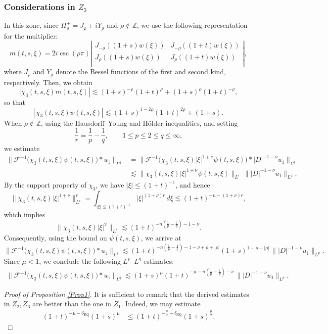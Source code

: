 \documentclass[10pt]{article}
\newcommand{\<}{\langle}
\renewcommand{\>}{\rangle}
\numberwithin{equation}{section}
\begin{document}
\subsubsection{Considerations in $Z_{3}$}
In this zone, since $H^{\pm}_{\rho}=J_{\rho} \pm i Y_{\rho}$ and $\rho\notin \mathbb{Z}$, we use the following representation for the multiplier:
\begin{equation*}\label{Bessel-BQ}
m(t, s, \xi)=2i\csc(\rho \pi)
\left| \begin{array}{cc}
J_{-\rho}\left( (1+s)w(\xi) \right) & J_{-\rho}\left( (1+t)w(\xi) \right) \\
J_{\rho}\left( (1+s)w(\xi) \right) &  J_{\rho}\left( (1+t)w(\xi) \right) \\
\end{array} \right|,
\end{equation*}
where $J_{\rho}$ and $Y_{\rho}$ denote the Bessel functions of the first and second kind, respectively. Then, we obtain
\[ |\chi_3(t, s,\xi) m(t, s, \xi)| \lesssim (1+s)^{-\rho}(1+t)^{\rho} + (1+s)^{\rho}(1+t)^{-\rho}, \]
so that
\[ |\chi_3(t, s,\xi) \psi(t,s,\xi)|\lesssim (1+s)^{1-2\rho}(1+t)^{2\rho} + (1+s). \]
When $\rho\not\in \mathbb{Z}$, using the Hausdorff--Young and Hölder inequalities, and setting
\[ \frac{1}{r}=\frac{1}{p}-\frac{1}{q}, \qquad 1\le p\le 2\le q\le\infty, \]
we estimate
\begin{align*}
\big\|\mathcal{F}^{-1}\big(\chi_3(t,s,\xi)\psi(t,s,\xi)\big)\ast u_1\big\|_{L^q}
&= \big\|\mathcal{F}^{-1}\big(\chi_3(t,s,\xi)|\xi|^{1+\nu}\psi(t,s,\xi)\big)\ast |D|^{-1-\nu}u_1\big\|_{L^q} \\
&\lesssim \|\chi_3(t,s,\xi)|\xi|^{1+\nu}\psi(t,s,\xi)\|_{L^r}\, \||D|^{-1-\nu}u_1\|_{L^p}.
\end{align*}
By the support property of $\chi_3$, we have $|\xi|\le (1+t)^{-1}$, and hence
\[ \|\chi_3(t,s,\xi)|\xi|^{1+\nu}\|_{L^r}^r = \int_{|\xi|\le (1+t)^{-1}}|\xi|^{(1+\nu)r}\,d\xi \lesssim (1+t)^{-n-(1+\nu)r}, \]
which implies
\[ \|\chi_3(t,s,\xi)|\xi|^{2}\|_{L^r} \lesssim (1+t)^{-n\left(\frac{1}{p}-\frac{1}{q}\right)-1-\nu}. \]
Consequently, using the bound on $\psi(t,s,\xi)$, we arrive at
\[ \big\|\mathcal{F}^{-1}\big(\chi_3(t,s,\xi)\psi(t,s,\xi)\big)\ast u_1\big\|_{L^q} \lesssim (1+t)^{-n\left(\frac{1}{p}-\frac{1}{q}\right)-1-\nu+\rho+|\rho|}(1+s)^{1-\rho-|\rho|} \,\||D|^{-1-\nu}u_1\|_{L^p}. \]
Since $\mu<1$, we conclude the following $L^p$--$L^q$ estimates:
\begin{align*}
\big\|\mathcal{F}^{-1}\big( \chi_3(t,s,\xi)\psi(t,s,\xi) \big)\ast u_1\big\|_{L^q}
\lesssim (1+s)^{\mu} (1+t)^{-\mu-n\left(\frac{1}{p}-\frac{1}{q}\right)-\nu} \,\||D|^{-1-\nu}u_1\|_{L^p}.
\end{align*}
\begin{proof}[Proof of Proposition \ref{Prop1}]
It is sufficient to remark that the derived estimates in $Z_2, Z_3$ are better than the one in $Z_1$. Indeed, we may estimate
\begin{align*}
(1+t)^{-\mu-\delta_{\text{BQ}}}(1+s)^{\mu} &\leq (1+t)^{-\frac{\mu}2-\delta_{\text{BQ}}}(1+s)^{\frac{\mu}2}.
\end{align*}
\end{proof}
\end{document}
